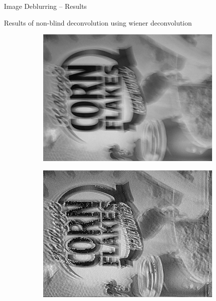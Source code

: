 \documentclass{beamer}
\begin{document}
\begin{frame}{Image Deblurring -- Results}

Results of non-blind deconvolution using wiener deconvolution
\begin{figure}
\begin{center}
	\begin{subfigure}{Blurred image.}
		\resizebox{20mm}{!} {\includegraphics {../images/deblur/imblur.png}}
	\end{subfigure}
	\begin{subfigure}{Image deblurred using wiener deconvolution.}
		\resizebox{20mm}{!} {\includegraphics {../images/deblur/imdeblur.png}}
	\end{subfigure}
	\begin{subfigure}{Image deblurred using state of the art deconvolution algorithm.}

\end{subfigure}
\end{center}
\end{figure}
\end{frame}
\end{document}
